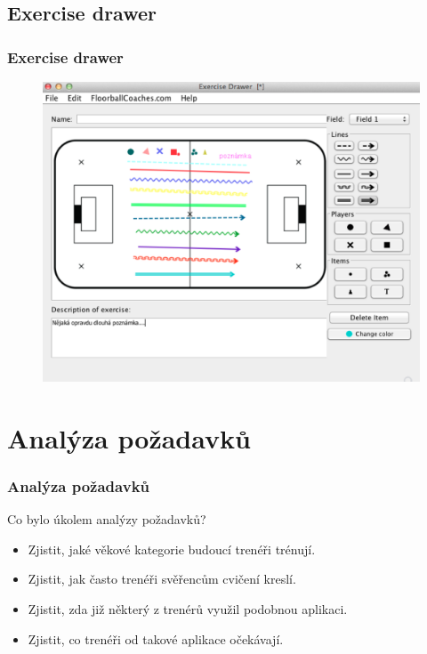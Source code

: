\documentclass{beamer}
\begin{document}
\subsection{Exercise drawer}
\begin{frame}
\frametitle{Exercise drawer}
  \begin{figure}[H]
    \includegraphics[height=.8\textheight]{img/exercise_drawer}
    \label{pic:exercisedrawer}
  \end{figure}
\end{frame}

\section{Analýza požadavků}

\begin{frame}
  \frametitle{Analýza požadavků}

  Co bylo úkolem analýzy požadavků?

  \begin{itemize}
      \item Zjistit, jaké věkové kategorie budoucí trenéři trénují.
      \item Zjistit, jak často trenéři svěřencům cvičení kreslí.
      \item Zjistit, zda již některý z trenérů využil podobnou aplikaci.
      \item Zjistit, co trenéři od takové aplikace očekávají.
  \end{itemize}
\end{frame}
\end{document}
